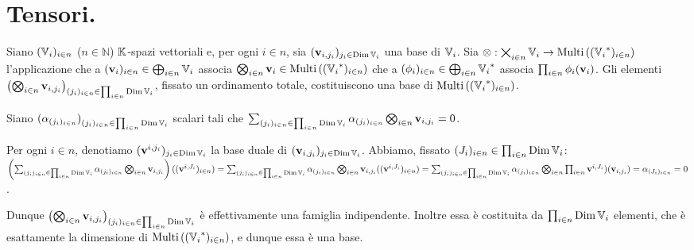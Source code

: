 \section{Tensori.}\label{Tensori}
\begin{Theorem}
	Siano $(\mathbb{V}_i)_{i \in n}$ ($n \in \mathbb{N}$) $\mathbb{K}$-spazi vettoriali e, per ogni $i \in n$, sia $(\mathbf{v}_{i,j_i})_{j_i \in \operatorname{\operatorname{Dim}}{\mathbb{V}_i}}$ una base di $\mathbb{V}_i$.
	Sia $\otimes: \bigtimes_{i \in n} \mathbb{V}_i \rightarrow \text{Multi}\left ( ({{\mathbb{V}_i}^*})_{i \in n} \right )$ l'applicazione che a $(\mathbf{v}_i)_{i \in n} \in \bigoplus_{i \in n} \mathbb{V}_i$ associa $\bigotimes_{i \in n} \mathbf{v}_i \in \text{Multi}\left ( ({{\mathbb{V}_i}^*})_{i \in n} \right )$ che a $(\phi_i)_{i \in n} \in \bigoplus_{i \in n} {{\mathbb{V}_i}^*}$ associa $\prod_{i \in n} \phi_i(\mathbf{v}_i)$.
 Gli elementi $\left (\bigotimes_{i \in n} \mathbf{v}_{i,j_i} \right )_{(j_i)_{i \in n} \in \prod_{i \in n} \operatorname{\operatorname{Dim}}{\mathbb{V}_i}}$, fissato un ordinamento totale, costituiscono una base di $\text{Multi}\left ( ({{\mathbb{V}_i}^*})_{i \in n} \right )$.
\end{Theorem}
\Proof Siano $(\alpha_{(j_i)_{i \in n}})_{(j_i)_{i \in n} \in \prod_{i \in n} \operatorname{\operatorname{Dim}}{\mathbb{V}_i}}$ scalari tali che
$\sum_{(j_i)_{i \in n} \in \prod_{i \in n} \operatorname{\operatorname{Dim}}{\mathbb{V}_i}} \alpha_{(j_i)_{i \in n}} \bigotimes_{i \in n} \mathbf{v}_{i,j_i} = 0$.
\par Per ogni $i \in n$, denotiamo $(\mathbf{v}^{i,j_i})_{j_i \in \operatorname{\operatorname{Dim}}{\mathbb{V}_i}}$ la base duale di $(\mathbf{v}_{i,j_i})_{j_i \in \operatorname{\operatorname{Dim}}{\mathbb{V}_i}}$. Abbiamo, fissato $(J_i)_{i \in n} \in \prod_{i \in n} \operatorname{\operatorname{Dim}}{\mathbb{V}_i}$:
$\left (\sum_{(j_i)_{i \in n} \in \prod_{i \in n} \operatorname{\operatorname{Dim}}{\mathbb{V}_i}} \alpha_{(j_i)_{i \in n}} \bigotimes_{i \in n} \mathbf{v}_{i,j_i} \right ) ( (\mathbf{v}^{i,J_i})_{i \in n} ) =
\sum_{(j_i)_{i \in n} \in \prod_{i \in n} \operatorname{\operatorname{Dim}}{\mathbb{V}_i}} \alpha_{(j_i)_{i \in n}} \bigotimes_{i \in n} \mathbf{v}_{i,j_i}( (\mathbf{v}^{i,J_i})_{i \in n} ) =
\sum_{(j_i)_{i \in n} \in \prod_{i \in n} \operatorname{\operatorname{Dim}}{\mathbb{V}_i}} \alpha_{(j_i)_{i \in n}} \bigotimes_{i \in n} \prod_{i \in n} \mathbf{v}^{i,J_i})(\mathbf{v}_{i,j_i}) =
\alpha_{(J_i)_{i \in n}} = 0$.
\par Dunque $\left ( \bigotimes_{i \in n} \mathbf{v}_{i,j_i} \right )_{(j_i)_{i \in n} \in \prod_{i \in n} \operatorname{\operatorname{Dim}}{\mathbb{V}_i}}$ \`e effettivamente una famiglia indipendente. Inoltre essa \`e costituita da $\prod_{i \in n} \operatorname{\operatorname{Dim}}{\mathbb{V}_i}$ elementi, che \`e esattamente la dimensione di $\text{Multi}\left ( ({{\mathbb{V}_i}^*})_{i \in n} \right )$, e dunque essa \`e una base. \EndProof
